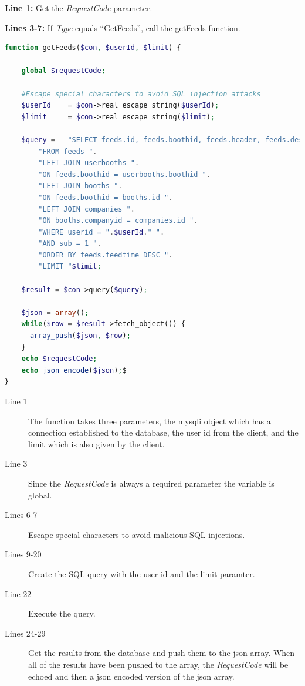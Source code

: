 \begin{description}
\item \textbf{Line 1: }Get the \textit{RequestCode} parameter.
\item \textbf{Lines 3-7: }If \textit{Type} equals ``GetFeeds'', call the getFeeds function.
\end{description}


\begin{lstlisting}[language=php, label=lst:getFeeds, caption=getFeeds function]
function getFeeds($con, $userId, $limit) {

    global $requestCode;

    #Escape special characters to avoid SQL injection attacks
    $userId    = $con->real_escape_string($userId);
    $limit     = $con->real_escape_string($limit);

    $query =   "SELECT feeds.id, feeds.boothid, feeds.header, feeds.description, feeds.feedtime, userbooths.userid, companies.logo, booths.name ".
        "FROM feeds ".
        "LEFT JOIN userbooths ".
        "ON feeds.boothid = userbooths.boothid ".
        "LEFT JOIN booths ".
        "ON feeds.boothid = booths.id ".
        "LEFT JOIN companies ".
        "ON booths.companyid = companies.id ".
        "WHERE userid = ".$userId." ".
        "AND sub = 1 ".
        "ORDER BY feeds.feedtime DESC ".
        "LIMIT "$limit;

    $result = $con->query($query);

    $json = array();
    while($row = $result->fetch_object()) {
      array_push($json, $row);
    }
    echo $requestCode;
    echo json_encode($json);$
}
\end{lstlisting} 

\begin{description}
\item[Line 1] The function takes three parameters, the mysqli object which has a connection
  established to the database, the user id from the client, and the limit which is also given by the client.
\item[Line 3] Since the \textit{RequestCode} is always a required parameter the variable is global.
\item[Lines 6-7] Escape special characters to avoid malicious SQL injections.
\item[Lines 9-20] Create the SQL query with the user id and the limit paramter.
\item[Line 22] Execute the query.
\item[Lines 24-29] Get the results from the database and push them to the json array. When
  all of the results have been pushed to the array, the \textit{RequestCode} will be echoed and then
  a json encoded version of the json array.
\end{description}

